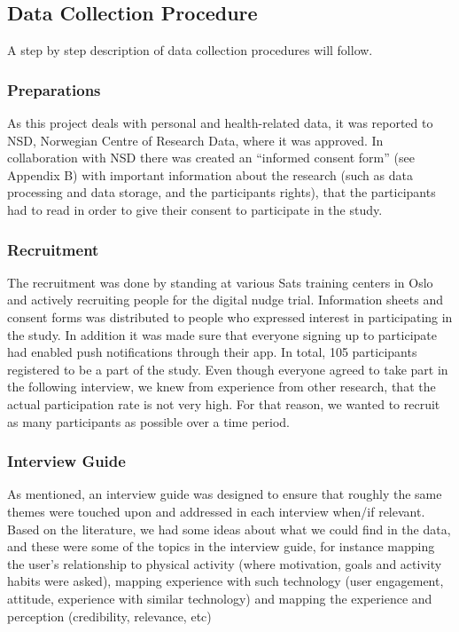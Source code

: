     \subsection{Data Collection Procedure}
A step by step description of data collection procedures will follow. 
    
        \subsubsection{Preparations}
        As this project deals with personal and health-related data, it was reported to NSD, Norwegian Centre of Research Data, where it was approved. In collaboration with NSD there was created an “informed consent form” (see Appendix B) with important information about the research (such as data processing and data storage, and the participants rights), that the participants had to read in order to give their consent to participate in the study. 
        
        \subsubsection{Recruitment}
        The recruitment was done by standing at various Sats training centers in Oslo and actively recruiting people for the digital nudge trial. Information sheets and consent forms was distributed to people who expressed interest in participating in the study. In addition it was made sure that everyone signing up to participate had enabled push notifications through their app. In total, 105 participants registered to be a part of the study. Even though everyone agreed to take part in the following interview, we knew from experience from other research, that the actual participation rate is not very high. For that reason, we wanted to recruit as many participants as possible over a time period. 
        
        
        \subsubsection{Interview Guide}
	As mentioned, an interview guide was designed to ensure that roughly the same themes were touched upon and addressed in each interview when/if relevant. Based on the literature, we had some ideas about what we could find in the data, and these were some of the topics in the interview guide, for instance mapping the user's relationship to physical activity (where motivation, goals and activity habits were asked), mapping experience with such technology (user engagement, attitude, experience with similar technology) and mapping the experience and perception (credibility, relevance, etc)
        

